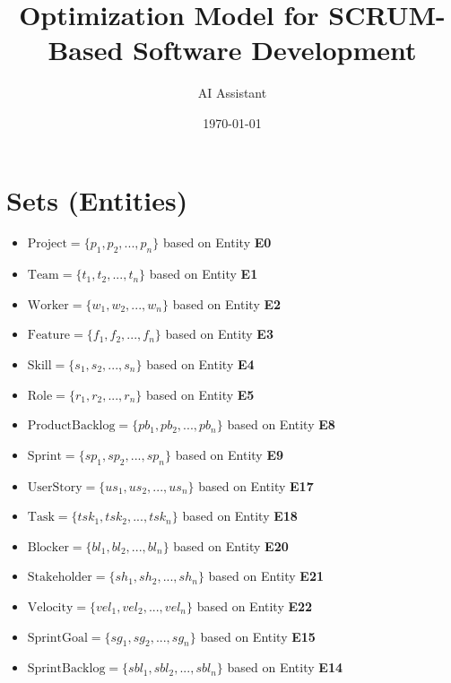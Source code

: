 \documentclass[11pt]{article}
\title{Optimization Model for SCRUM-Based Software Development}
\author{AI Assistant}
\date{\today}
\begin{document}
\maketitle
\tableofcontents
\newpage

\section{Sets (Entities)}
\begin{itemize}
    \item $\text{Project} = \{p_1, p_2, ..., p_n\}$ based on Entity \textbf{E0}
    \item $\text{Team} = \{t_1, t_2, ..., t_n\}$ based on Entity \textbf{E1}
    \item $\text{Worker} = \{w_1, w_2, ..., w_n\}$ based on Entity \textbf{E2}
    \item $\text{Feature} = \{f_1, f_2, ..., f_n\}$ based on Entity \textbf{E3}
    \item $\text{Skill} = \{s_1, s_2, ..., s_n\}$ based on Entity \textbf{E4}
    \item $\text{Role} = \{r_1, r_2, ..., r_n\}$ based on Entity \textbf{E5}
    \item $\text{ProductBacklog} = \{pb_1, pb_2, ..., pb_n\}$ based on Entity \textbf{E8}
    \item $\text{Sprint} = \{sp_1, sp_2, ..., sp_n\}$ based on Entity \textbf{E9}
    \item $\text{UserStory} = \{us_1, us_2, ..., us_n\}$ based on Entity \textbf{E17}
    \item $\text{Task} = \{tsk_1, tsk_2, ..., tsk_n\}$ based on Entity \textbf{E18}
    \item $\text{Blocker} = \{bl_1, bl_2, ..., bl_n\}$ based on Entity \textbf{E20}
    \item $\text{Stakeholder} = \{sh_1, sh_2, ..., sh_n\}$ based on Entity \textbf{E21}
    \item $\text{Velocity} = \{vel_1, vel_2, ..., vel_n\}$ based on Entity \textbf{E22}
    \item $\text{SprintGoal} = \{sg_1, sg_2, ..., sg_n\}$ based on Entity \textbf{E15}
    \item $\text{SprintBacklog} = \{sbl_1, sbl_2, ..., sbl_n\}$ based on Entity \textbf{E14}
\end{itemize}
\end{document}
